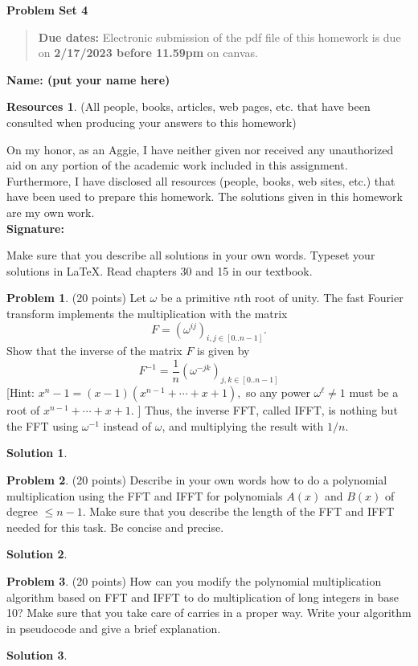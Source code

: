 \documentclass{article}
\theoremstyle{definition}
\newtheorem{problem}{Problem}
\newtheorem*{solution}{Solution}
\newtheorem*{resources}{Resources}
\newcommand{\name}[1]{\noindent\textbf{Name: #1}}
\newcommand{\honor}{\noindent On my honor, as an Aggie, I have neither
  given nor received any unauthorized aid on any portion of the
  academic work included in this assignment. Furthermore, I have
  disclosed all resources (people, books, web sites, etc.) that have
  been used to prepare this homework. The solutions given in this
  homework are my own work.\\[1ex]
 \textbf{Signature:} \underline{\hspace*{5cm}} }
\newcommand{\problemset}[1]{\begin{center}\textbf{Problem Set
      #1}\end{center}}
\newcommand{\duedate}[2]{\begin{quote}\textbf{Due dates:} Electronic
    submission of the pdf file of this homework is due on
    \textbf{#1} on canvas. \end{quote} }
\begin{document}
\problemset{4}
\duedate{2/17/2023 before 11.59pm}{}
\name{ (put your name here)}
\begin{resources} (All people, books, articles, web pages, etc. that
  have been consulted when producing your answers to this homework)
\end{resources}
\honor

\newpage
Make sure that you describe all solutions in your own words. Typeset
your solutions in \LaTeX. Read
chapters 30 and 15 in our textbook. 

\begin{problem} (20 points) Let $\omega$ be a primitive $n$th root of unity. 
The fast Fourier transform implements the multiplication with
  the matrix 
$$ F = (\omega^{ij})_{i,j\in [0..n-1]}.$$
Show that the inverse of the matrix $F$ is given by 
$$ F^{-1} = \frac{1}{n}  (\omega^{-jk})_{j,k\in [0..n-1]}$$
[Hint: $x^n-1= (x-1)(x^{n-1}+\cdots + x + 1),$ so any power
$\omega^\ell\neq 1$  must be a root of $x^{n-1}+\cdots + x + 1$.  ]  
Thus, the inverse FFT, called IFFT, is nothing but the FFT using
$\omega^{-1}$ instead of $\omega$, and multiplying the result with
$1/n$. 
\end{problem}
\begin{solution}
\end{solution}

\begin{problem} (20 points) 
Describe in your own words how to do a polynomial multiplication using the FFT and
  IFFT for polynomials $A(x)$ and $B(x)$ of degree $\le n-1$. Make
  sure that you describe the length of the FFT and IFFT needed for
  this task. Be concise and precise. 
\end{problem}
\begin{solution}
\end{solution}

\begin{problem} (20 points) 
How can you modify the polynomial multiplication algorithm based
  on FFT and IFFT to do multiplication of long integers in base 10?
  Make sure that you take care of carries in a proper way. Write your
  algorithm in pseudocode and give a brief explanation. 
\end{problem}
\begin{solution}
\end{solution}
\end{document}

